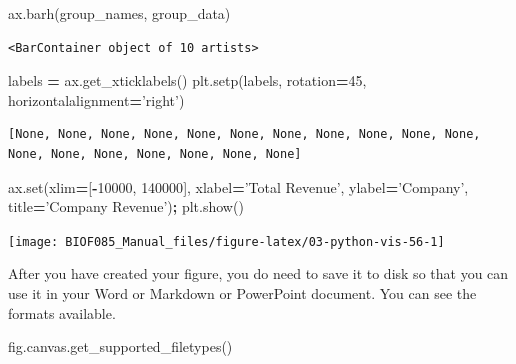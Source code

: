 \documentclass[
  letterpaper,
]{scrbook}
\newenvironment{Shaded}{\begin{snugshade}}{\end{snugshade}}
\newcommand{\BuiltInTok}[1]{#1}
\newcommand{\DecValTok}[1]{\textcolor[rgb]{0.00,0.00,0.81}{#1}}
\newcommand{\NormalTok}[1]{#1}
\newcommand{\OperatorTok}[1]{\textcolor[rgb]{0.81,0.36,0.00}{\textbf{#1}}}
\newcommand{\StringTok}[1]{\textcolor[rgb]{0.31,0.60,0.02}{#1}}
\begin{document}
\begin{Shaded}
\begin{Highlighting}[]
\NormalTok{ax.barh(group_names, group_data)}
\end{Highlighting}
\end{Shaded}

\begin{verbatim}
<BarContainer object of 10 artists>
\end{verbatim}

\begin{Shaded}
\begin{Highlighting}[]
\NormalTok{labels }\OperatorTok{=}\NormalTok{ ax.get_xticklabels()}
\NormalTok{plt.setp(labels, rotation}\OperatorTok{=}\DecValTok{45}\NormalTok{, horizontalalignment}\OperatorTok{=}\StringTok{'right'}\NormalTok{)}
\end{Highlighting}
\end{Shaded}

\begin{verbatim}
[None, None, None, None, None, None, None, None, None, None, None, None, None, None, None, None, None, None]
\end{verbatim}

\begin{Shaded}
\begin{Highlighting}[]
\NormalTok{ax.}\BuiltInTok{set}\NormalTok{(xlim}\OperatorTok{=}\NormalTok{[}\OperatorTok{-}\DecValTok{10000}\NormalTok{, }\DecValTok{140000}\NormalTok{], xlabel}\OperatorTok{=}\StringTok{'Total Revenue'}\NormalTok{, ylabel}\OperatorTok{=}\StringTok{'Company'}\NormalTok{,}
\NormalTok{       title}\OperatorTok{=}\StringTok{'Company Revenue'}\NormalTok{)}\OperatorTok{;}
\NormalTok{plt.show()}
\end{Highlighting}
\end{Shaded}

\begin{center}\texttt{[image: BIOF085\_Manual\_files/figure-latex/03-python-vis-56-1]} \end{center}

After you have created your figure, you do need to save it to disk so that you can use it in your Word or Markdown or PowerPoint document. You can see the formats available.

\begin{Shaded}
\begin{Highlighting}[]
\NormalTok{fig.canvas.get_supported_filetypes()}
\end{Highlighting}
\end{Shaded}
\end{document}

